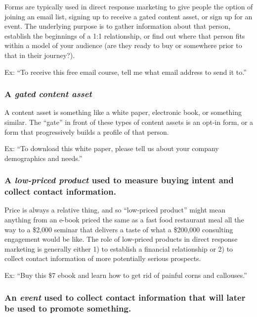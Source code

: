 \documentclass[13pt,]{tufte-handout}
\begin{document}
Forms are typically used in direct response marketing to give people the
option of joining an email list, signing up to receive a gated content
asset, or sign up for an event. The underlying purpose is to gather
information about that person, establish the beginnings of a 1:1
relationship, or find out where that person fits within a model of your
audience (are they ready to buy or somewhere prior to that in their
journey?).

Ex: ``To receive this free email course, tell me what email address to
send it to.''

\hypertarget{a-gated-content-asset}{%
\subsubsection{\texorpdfstring{A \emph{gated content
asset}}{A gated content asset}}\label{a-gated-content-asset}}

A content asset is something like a white paper, electronic book, or
something similar. The ``gate'' in front of these types of content
assets is an opt-in form, or a form that progressively builds a profile
of that person.

Ex: ``To download this white paper, please tell us about your company
demographics and needs.''

\hypertarget{a-low-priced-product-used-to-measure-buying-intent-and-collect-contact-information.}{%
\subsubsection{\texorpdfstring{A \emph{low-priced product} used to
measure buying intent and collect contact
information.}{A low-priced product used to measure buying intent and collect contact information.}}\label{a-low-priced-product-used-to-measure-buying-intent-and-collect-contact-information.}}

Price is always a relative thing, and so ``low-priced product'' might
mean anything from an e-book priced the same as a fast food restaurant
meal all the way to a \$2,000 seminar that delivers a taste of what a
\$200,000 consulting engagement would be like. The role of low-priced
products in direct response marketing is generally either 1) to
establish a financial relationship or 2) to collect contact information
of more potentially serious prospects.

Ex: ``Buy this \$7 ebook and learn how to get rid of painful corns and
callouses.''

\hypertarget{an-event-used-to-collect-contact-information-that-will-later-be-used-to-promote-something.}{%
\subsubsection{\texorpdfstring{An \emph{event} used to collect contact
information that will later be used to promote
something.}{An event used to collect contact information that will later be used to promote something.}}\label{an-event-used-to-collect-contact-information-that-will-later-be-used-to-promote-something.}}
\end{document}
